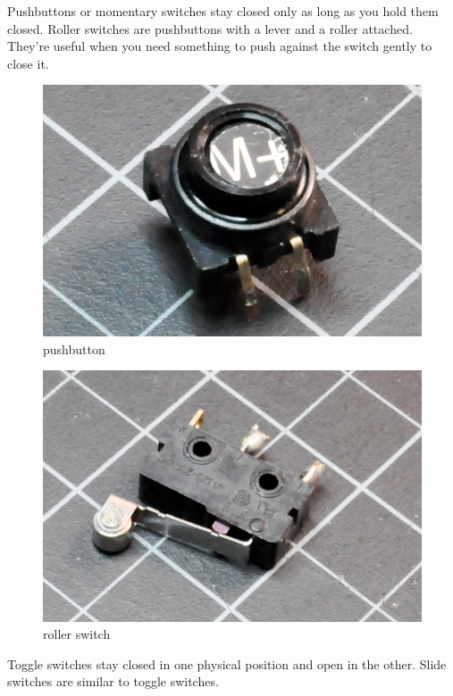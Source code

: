 Pushbuttons or momentary switches stay closed only as long as you hold them closed. Roller switches are pushbuttons with a lever and a roller attached. They're useful when you need something to push against the switch gently to close it.

\begin{figure}[!htb]
 \centering
 \includegraphics[scale=0.3]{img/switches/pushbutton.jpg}
 \caption{pushbutton}
 \label{pushbutton}
\end{figure}

\begin{figure}[!htb]
 \centering
 \includegraphics[scale=0.3]{img/switches/roller_switch.jpg}
 \caption{roller switch}
 \label{roller switch}
\end{figure}

Toggle switches stay closed in one physical position and open in the other. Slide switches are similar to toggle switches.

